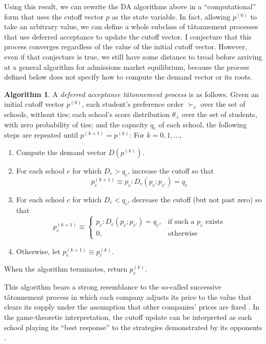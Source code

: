 \documentclass[12pt]{article}
\numberwithin{equation}{subsection}
\theoremstyle{definition}
\newtheorem{algorithm}{Algorithm}
\begin{document}
Using this result, we can rewrite the DA algorithms above in a ``computational'' form that uses the cutoff vector $p$ as the state variable. In fact, allowing $p^{(0)}$ to take an arbitrary value, we can define a whole subclass of t\^{a}tonnement processes that use deferred acceptance to update the cutoff vector. I conjecture that this process converges regardless of the value of the initial cutoff vector. However, even if that conjecture is true, we still have some distance to tread before arriving at a general algorithm for admissions market equilibrium, because the process defined below does not specify how to compute the demand vector or its roots.
\begin{algorithm}
A \emph{deferred acceptance t\^{a}tonnement process} is as follows. Given an initial cutoff vector $p^{(0)}$, each student's preference order $\succ_s$ over the set of schools, without ties;  each school's score distribution $\theta_{.c}$ over the set of students, with zero probability of ties; and the capacity $q_c$ of each school, the following steps are repeated until $p^{(k+1)} = p^{(k)}$: For $k = 0, 1, \dots$, 
\begin{enumerate}
\item Compute the demand vector $D (p^{(k)})$. 
\item For each school $c$ for which $D_c > q_c$, increase the cutoff so that
\[p_c^{(k+1)} \equiv p_c: D_c(p_c; p_{c'} ) = q_c\]
\item For each school $c$ for which $D_c < q_c$, decrease the cutoff (but not past zero) so that
\[p_c^{(k+1)} \equiv \begin{cases}
p_c: D_c(p_c; p_{c'} ) = q_c, &\text{if such a } p_c \text{ exists}\\
0, &\text{otherwise}
\end{cases}\]
\item Otherwise, let $p_c^{(k+1)} \equiv p_c^{(k)}$.
\end{enumerate}
When the algorithm terminates, return $p_c^{(k)}$. 
\end{algorithm}

This algorithm bears a strong resemblance to the so-called successive t\^{a}tonnement process in which each company adjusts its price to the value that clears its supply under the assumption that other companies' prices are fixed \parencite[see][equation 6]{walrastatonnement}. In the game-theoretic interpretation, the cutoff update can be interpreted as each school playing its ``best response'' to the strategies demonstrated by its opponents \parencite[][\S19.3.4]{networkformationgames}. 
\end{document}
